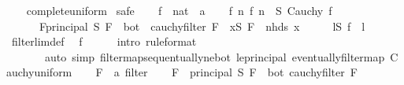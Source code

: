 \begin{isabellebody}
%
\isadelimproof
\ \ %
\endisadelimproof
%
\isatagproof
{}\isamarkupfalse%
\ complete{\isacharunderscore}{\kern0pt}uniform\isanewline
{}\isamarkupfalse%
\ safe\isanewline
\ \ \isamarkupfalse%
\ f\ {\isacharcolon}{\kern0pt}{\isacharcolon}{\kern0pt}\ {\isachardoublequoteopen}nat\ {\isasymRightarrow}\ {\isacharprime}{\kern0pt}a{\isachardoublequoteclose}\isanewline
\ \ \isamarkupfalse%
\ f{\isacharcolon}{\kern0pt}\ {\isachardoublequoteopen}{\isasymforall}n{\isachardot}{\kern0pt}\ f\ n\ {\isasymin}\ S{\isachardoublequoteclose}\ {\isachardoublequoteopen}Cauchy\ f{\isachardoublequoteclose}\isanewline
\ \ \ \ \ {\isacharasterisk}{\kern0pt}{\isacharcolon}{\kern0pt}\ {\isachardoublequoteopen}{\isasymforall}F{\isasymle}principal\ S{\isachardot}{\kern0pt}\ F\ {\isasymnoteq}\ bot\ {\isasymlongrightarrow}\ cauchy{\isacharunderscore}{\kern0pt}filter\ F\ {\isasymlongrightarrow}\ {\isacharparenleft}{\kern0pt}{\isasymexists}x{\isasymin}S{\isachardot}{\kern0pt}\ F\ {\isasymle}\ nhds\ x{\isacharparenright}{\kern0pt}{\isachardoublequoteclose}\isanewline
\ \ \isamarkupfalse%
\ \isamarkupfalse%
\ {\isachardoublequoteopen}{\isasymexists}l{\isasymin}S{\isachardot}{\kern0pt}\ f\ {\isasymlonglonglongrightarrow}\ l{\isachardoublequoteclose}\isanewline
\ \ \ \ \isamarkupfalse%
\ filterlim{\isacharunderscore}{\kern0pt}def\ \isamarkupfalse%
\ f\isanewline
\ \ \ \ \isamarkupfalse%
\ {\isacharparenleft}{\kern0pt}intro\ {\isacharasterisk}{\kern0pt}{\isacharbrackleft}{\kern0pt}rule{\isacharunderscore}{\kern0pt}format{\isacharbrackright}{\kern0pt}{\isacharparenright}{\kern0pt}\isanewline
\ \ \ \ \ \ \ {\isacharparenleft}{\kern0pt}auto\ simp{\isacharcolon}{\kern0pt}\ filtermap{\isacharunderscore}{\kern0pt}sequentually{\isacharunderscore}{\kern0pt}ne{\isacharunderscore}{\kern0pt}bot\ le{\isacharunderscore}{\kern0pt}principal\ eventually{\isacharunderscore}{\kern0pt}filtermap\ Cauchy{\isacharunderscore}{\kern0pt}uniform{\isacharparenright}{\kern0pt}\isanewline
{}\isamarkupfalse%
\isanewline
\ \ \isamarkupfalse%
\ F\ {\isacharcolon}{\kern0pt}{\isacharcolon}{\kern0pt}\ {\isachardoublequoteopen}{\isacharprime}{\kern0pt}a\ filter{\isachardoublequoteclose}\isanewline
\ \ \isamarkupfalse%
\ {\isachardoublequoteopen}F\ {\isasymle}\ principal\ S{\isachardoublequoteclose}\ {\isachardoublequoteopen}F\ {\isasymnoteq}\ bot{\isachardoublequoteclose}\ {\isachardoublequoteopen}cauchy{\isacharunderscore}{\kern0pt}filter\ F{\isachardoublequoteclose}\isanewline

\end{isabellebody}
